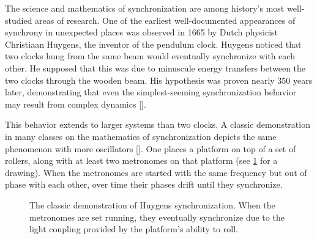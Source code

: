 The science and mathematics of synchronization are among history's most well-studied areas of research.
One of the earliest well-documented appearances of synchrony in unexpected places was observed in 1665 by Dutch physicist Christiaan Huygens, the inventor of the pendulum clock.
Huygens noticed that two clocks hung from the same beam would eventually synchronize with each other.
He supposed that this was due to minuscule energy transfers between the two clocks through the wooden beam.
His hypothesis was proven nearly 350 years later, demonstrating that even the simplest-seeming synchronization behavior may result from complex dynamics [].

This behavior extends to larger systems than two clocks.
A classic demonstration in many classes on the mathematics of synchronization depicts the same phenomenon with more oscillators [].
One places a platform on top of a set of rollers, along with at least two metronomes on that platform (see \cref{fig:metronome_demo} for a drawing).
When the metronomes are started with the same frequency but out of phase with each other, over time their phases drift until they synchronize.
\begin{figure}[ht]
  \centering
  \caption[Synchronization demonstration]{The classic demonstration of Huygens synchronization.  When the metronomes are set running, they eventually synchronize due to the light coupling provided by the platform's ability to roll.}
  \label{fig:metronome_demo}
\end{figure}

